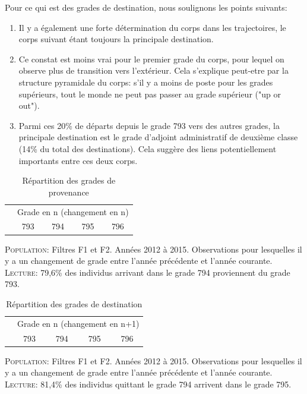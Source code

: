 \documentclass[11pt,a4paper]{article}
\begin{document}
Pour ce qui est des grades de destination, nous soulignons les points suivants: 
\begin{enumerate}[leftmargin=1cm ,parsep=0cm,itemsep=0cm,topsep=0cm] 
\item Il y a également une forte détermination du corps dans les trajectoires, le corps suivant étant toujours la principale destination. 
\item Ce constat est moins vrai pour le premier grade du corps, pour lequel on observe plus de transition vers l'extérieur. Cela s'explique peut-etre par la structure pyramidale du corps: s'il y a moins de poste pour les grades supérieurs, tout le monde ne peut pas passer au grade supérieur ("up or out"). 
\item Parmi ces 20\% de départs depuis le grade 793 vers des autres grades, la principale destination est le grade d'adjoint administratif de deuxième classe (14\% du total des destinations). Cela suggère des liens potentiellement importants entre ces deux corps.
\end{enumerate}


\medskip

\begin{table}[h!]
\centering
\caption{Répartition des grades de provenance} 
\label{entry}
\begin{tabular}{lcccc}
\toprule
 & \multicolumn{4}{c}{Grade en n (changement en n)} \\
 & 793 & 794 & 795 & 796 \\ 
  \hline
  
   \hline
\bottomrule
\end{tabular}
\begin{minipage}{12cm}
\footnotesize
\textsc{Population:} Filtres F1 et F2. Années 2012 à 2015. Observations pour lesquelles il y a un changement de grade entre l'année précédente et l'année courante. \\
\textsc{Lecture:} 79,6\% des individus arrivant dans le grade 794 proviennent du grade 793.
\end{minipage}
\end{table}

\medskip


\begin{table}[h!]
\centering
\caption{Répartition des grades de destination} 
\label{exit}
\begin{tabular}{lcccc}
\toprule
 & \multicolumn{4}{c}{Grade en n (changement en n+1)} \\
 & 793 & 794 & 795 & 796 \\ 
  \hline
  
   \hline
\bottomrule
\end{tabular}
\begin{minipage}{12cm}
\footnotesize
\textsc{Population:} Filtres F1 et F2. Années 2012 à 2015. Observations pour lesquelles il y a un changement de grade entre l'année précédente et l'année courante. \\
\textsc{Lecture:} 81,4\% des individus quittant le grade 794 arrivent dans le grade 795.
\end{minipage}
\end{table}
\medskip
\end{document}
